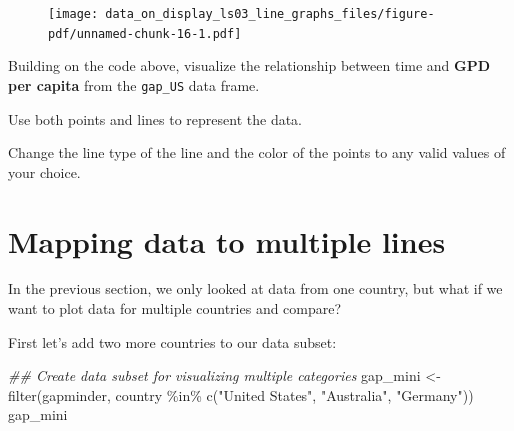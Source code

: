 \documentclass[
  letterpaper,
  DIV=11,
  numbers=noendperiod]{scrreprt}
\newenvironment{Shaded}{\begin{snugshade}}{\end{snugshade}}
\newcommand{\DocumentationTok}[1]{\textcolor[rgb]{0.37,0.37,0.37}{\textit{#1}}}
\newcommand{\FunctionTok}[1]{\textcolor[rgb]{0.28,0.35,0.67}{#1}}
\newcommand{\NormalTok}[1]{\textcolor[rgb]{0.00,0.23,0.31}{#1}}
\newcommand{\OtherTok}[1]{\textcolor[rgb]{0.00,0.23,0.31}{#1}}
\newcommand{\SpecialCharTok}[1]{\textcolor[rgb]{0.37,0.37,0.37}{#1}}
\newcommand{\StringTok}[1]{\textcolor[rgb]{0.13,0.47,0.30}{#1}}
\begin{document}
\begin{figure}[H]

{\centering \texttt{[image: data\_on\_display\_ls03\_line\_graphs\_files/figure-pdf/unnamed-chunk-16-1.pdf]}

}

\end{figure}

\begin{tcolorbox}[enhanced jigsaw, colframe=quarto-callout-tip-color-frame, rightrule=.15mm, opacityback=0, breakable, coltitle=black, colbacktitle=quarto-callout-tip-color!10!white, bottomrule=.15mm, leftrule=.75mm, toprule=.15mm, arc=.35mm, bottomtitle=1mm, colback=white, left=2mm, opacitybacktitle=0.6, titlerule=0mm, title=\textcolor{quarto-callout-tip-color}{\faLightbulb}\hspace{0.5em}{Practice}, toptitle=1mm]

Building on the code above, visualize the relationship between time and
\textbf{GPD per capita} from the \texttt{gap\_US} data frame.

Use both points and lines to represent the data.

Change the line type of the line and the color of the points to any
valid values of your choice.

\end{tcolorbox}

\hypertarget{mapping-data-to-multiple-lines}{%
\section{Mapping data to multiple
lines}\label{mapping-data-to-multiple-lines}}

In the previous section, we only looked at data from one country, but
what if we want to plot data for multiple countries and compare?

First let's add two more countries to our data subset:

\begin{Shaded}
\begin{Highlighting}[]
\DocumentationTok{\#\# Create data subset for visualizing multiple categories}
\NormalTok{gap\_mini }\OtherTok{\textless{}{-}} \FunctionTok{filter}\NormalTok{(gapminder,}
\NormalTok{                   country }\SpecialCharTok{\%in\%} \FunctionTok{c}\NormalTok{(}\StringTok{"United States"}\NormalTok{,}
                                  \StringTok{"Australia"}\NormalTok{,}
                                  \StringTok{"Germany"}\NormalTok{))}
\NormalTok{gap\_mini}
\end{Highlighting}
\end{Shaded}
\end{document}
